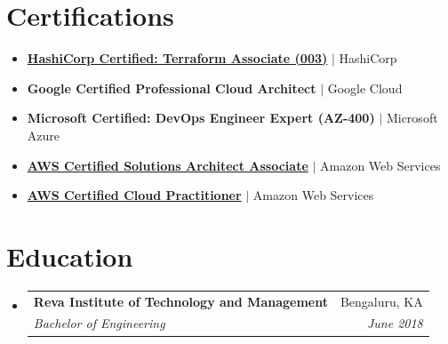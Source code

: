 \documentclass[letterpaper,11pt]{article}
\makeatletter
\newcommand{\resumeItemPlain}[1]{
  \item\small{
    {#1 \vspace{-2pt}}
  }
}
\newcommand{\resumeSubheading}[4]{
  \vspace{-1pt}\item
    \begin{tabular*}{0.97\textwidth}[t]{l@{\extracolsep{\fill}}r}
      \textbf{#1} & #2 \\
      \textit{\small#3} & \textit{\small #4} \\
    \end{tabular*}\vspace{-5pt}
}
\newcommand{\resumeSubHeadingListStart}{\begin{itemize}[leftmargin=*]}
\newcommand{\resumeSubHeadingListEnd}{\end{itemize}}
\makeatother
\begin{document}
\section{Certifications}
  \resumeSubHeadingListStart
    \resumeItemPlain{\href{https://www.credly.com/earner/earned/badge/59987b27-67e8-4638-ad2a-8b7feeb76faf}{\textbf{HashiCorp Certified: Terraform Associate (003)}} $|$ HashiCorp}
    \resumeItemPlain{\textbf{Google Certified Professional Cloud Architect} $|$ Google Cloud}
    \resumeItemPlain{\textbf{Microsoft Certified: DevOps Engineer Expert (AZ-400)} $|$ Microsoft Azure}
    \resumeItemPlain{\href{https://www.youracclaim.com/badges/305c90a5-8131-4b3c-8783-f6fa106cdf93/public_url}{\textbf{AWS Certified Solutions Architect Associate}} $|$ Amazon Web Services}
    \resumeItemPlain{\href{https://www.youracclaim.com/badges/1c31f0af-faae-4f11-be3c-c7de8e50ff4c/public_url}{\textbf{AWS Certified Cloud Practitioner}} $|$ Amazon Web Services}
  \resumeSubHeadingListEnd

\section{Education}
  \resumeSubHeadingListStart
    \resumeSubheading
      {Reva Institute of Technology and Management}{Bengaluru, KA}
      {Bachelor of Engineering}{June 2018}
  \resumeSubHeadingListEnd


\end{document}
